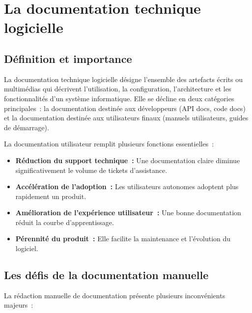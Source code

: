 \documentclass[12pt, a4paper, twoside, openany]{report}
\begin{document}
\section{La documentation technique logicielle}

\subsection{D\'efinition et importance}

\begin{definition}
La documentation technique logicielle d\'esigne l'ensemble des artefacts \'ecrits ou
multim\'edias qui d\'ecrivent l'utilisation, la configuration, l'architecture et les
fonctionnalit\'es d'un syst\`eme informatique. Elle se d\'ecline en deux cat\'egories
principales~: la documentation destin\'ee aux d\'eveloppeurs (API docs, code docs)
et la documentation destin\'ee aux utilisateurs finaux (manuels utilisateurs, guides
de d\'emarrage).
\end{definition}

La documentation utilisateur remplit plusieurs fonctions essentielles~:
\begin{itemize}
  \item \textbf{R\'eduction du support technique~:} Une documentation claire diminue
        significativement le volume de tickets d'assistance.
  \item \textbf{Acc\'el\'eration de l'adoption~:} Les utilisateurs autonomes adoptent
        plus rapidement un produit.
  \item \textbf{Am\'elioration de l'exp\'erience utilisateur~:} Une bonne documentation
        r\'eduit la courbe d'apprentissage.
  \item \textbf{P\'erennit\'e du produit~:} Elle facilite la maintenance et l'\'evolution
        du logiciel.
\end{itemize}

\subsection{Les d\'efis de la documentation manuelle}

La r\'edaction manuelle de documentation pr\'esente plusieurs inconv\'enients majeurs~:
\end{document}
